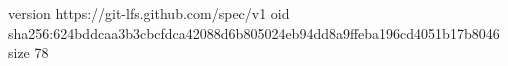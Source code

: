 version https://git-lfs.github.com/spec/v1
oid sha256:624bddcaa3b3cbcfdca42088d6b805024eb94dd8a9ffeba196cd4051b17b8046
size 78
